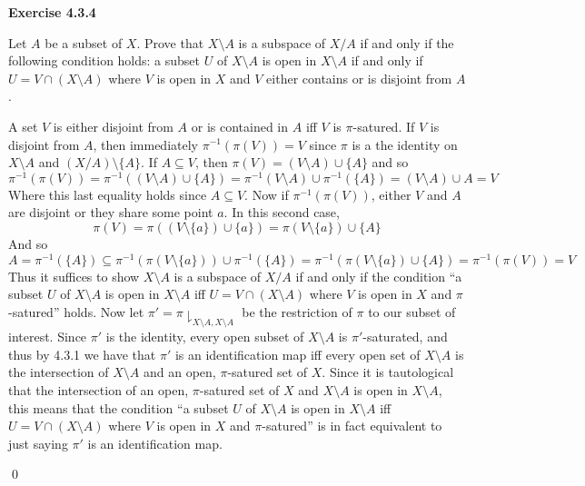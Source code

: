 \documentclass[12pt]{article}
\newcommand{\qcolor}{Gray}
\newcommand{\acolor}{Black}
\newcommand{\question}[1]{
	\color{\qcolor} 
	\item[#1~]}
\newcommand{\answer}[0]{
	\color{\acolor} 
	\item[]}
\newenvironment{exercise}[1]
{
	{
		\Large
		\color{\acolor}
		\addtolength\leftskip{-2em}
		\textbf{Exercise #1}
		
	}
	\begin{list}{}
	{
		\setlength\leftmargin{1em}
		\setlength\rightmargin{0em}
		\setlength\labelwidth{2em}
		\setlength\itemsep{0em}
		\setlength\parsep{0.5em}
		\setlength\baselineskip{1.25em}
	}
}
{
  \qed{}
  \end{list}
}
\begin{document}
\begin{exercise}{4.3.4}
  \question{} Let $A$ be a subset of $X$. Prove that $X \setminus A$ is a subspace of $X/A$ if and only if the following condition holds: a subset $U$ of $X\setminus A$ is open in $X\setminus A$ if and only if $U = V \cap (X\setminus A)$ where $V$ is open in $X$ and $V$ either contains or is disjoint from $A$.
  \answer
  A set $V$ is either disjoint from $A$ or is contained in $A$ iff $V$ is $\pi$-satured. If $V$ is disjoint from $A$, then immediately $\pi^{-1}(\pi(V)) = V$ since $\pi$ is a the identity on $X\setminus A$ and $(X/A)\setminus \{A\}$. If $A \subseteq V$, then $\pi(V) = (V\setminus A) \cup \{A\}$ and so
  $$\pi^{-1}(\pi(V)) = \pi^{-1}((V\setminus A) \cup \{A\}) = \pi^{-1}(V \setminus A) \cup \pi^{-1}(\{A\}) = (V \setminus A) \cup A = V$$
  Where this last equality holds since $A \subseteq V$. Now if $\pi^{-1}(\pi(V))$, either $V$ and $A$ are disjoint or they share some point $a$. In this second case,
  $$\pi(V) = \pi((V \setminus \{a\}) \cup \{a\}) = \pi(V \setminus \{a\}) \cup \{A\}$$
  And so
  $$A = \pi^{-1}(\{A\}) \subseteq \pi^{-1}(\pi(V \setminus \{a\})) \cup \pi^{-1}(\{A\}) = \pi^{-1}(\pi(V \setminus \{a\}) \cup \{A\}) = \pi^{-1}(\pi(V)) = V$$
  Thus it suffices to show $X \setminus A$ is a subspace of $X/A$ if and only if the condition ``a subset $U$ of $X\setminus A$ is open in $X\setminus A$ iff $U = V \cap (X\setminus A)$ where $V$ is open in $X$ and $\pi$-satured'' holds. Now let $\pi' = \pi\downharpoonright_{X\setminus A,X\setminus A}$ be the restriction of $\pi$ to our subset of interest. Since $\pi'$ is the identity, every open subset of $X\setminus A$ is $\pi'$-saturated, and thus by 4.3.1 we have that $\pi'$ is an identification map iff every open set of $X\setminus A$ is the intersection of $X\setminus A$ and an open, $\pi$-satured set of $X$. Since it is tautological that the intersection of an open, $\pi$-satured set of $X$ and $X\setminus A$ is open in $X\setminus A$, this means that the condition ``a subset $U$ of $X\setminus A$ is open in $X\setminus A$ iff $U = V \cap (X\setminus A)$ where $V$ is open in $X$ and $\pi$-satured'' is in fact equivalent to just saying $\pi'$ is an identification map.


\end{exercise}
\end{document}
